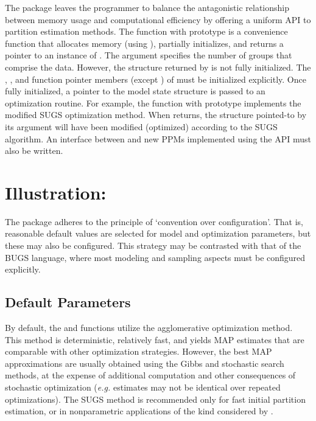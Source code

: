 \documentclass[article, nojss]{jss}
\begin{document}
The  package leaves the programmer to balance the antagonistic relationship between memory usage and computational efficiency by offering a uniform API to partition estimation methods. The  function with prototype  is a convenience function that allocates memory (using ), partially initializes, and returns a pointer to an instance of . The argument  specifies the number of groups that comprise the data. However, the structure returned by  is not fully initialized. The , ,  and function pointer members (except ) of  must be initialized explicitly. Once fully initialized, a pointer to the model state structure is passed to an optimization routine. For example, the function with prototype  implements the modified SUGS optimization method. When  returns, the structure pointed-to by its argument will have been modified (optimized) according to the SUGS algorithm. An interface between  and new PPMs implemented using the   API must also be written.

\section[Illustration]{Illustration: } \label{Examples:profLinear}

The  package adheres to the principle of `convention over configuration'. That is, reasonable default values are selected for model and optimization parameters, but these may also be configured. This strategy may be contrasted with that of the BUGS \citep{LunnSpiegelhalterThomasBest2009} language, where most modeling and sampling aspects must be configured explicitly.   

\subsection[Defaults]{Default Parameters}

By default, the  and  functions utilize the agglomerative optimization method. This method is deterministic, relatively fast, and yields MAP estimates that are comparable with other optimization strategies. However, the best MAP approximations are usually obtained using the Gibbs and stochastic search methods, at the expense of additional computation and other consequences of stochastic optimization ({\it e.g.} estimates may not be identical over repeated optimizations). The SUGS method is recommended only for fast initial partition estimation, or in nonparametric applications of the kind considered by \citep{WangDunson2010}.    
\end{document}
